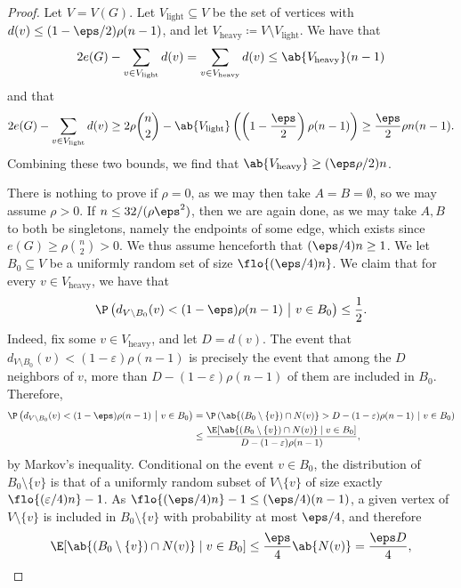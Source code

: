 \begin{proof}
    Let $V=V(G)$.
    Let $V_{\mathrm{light}}\subseteq V$ be the set of vertices with $d(v)\le (1-\eps/2)\rho (n-1)$, and let $V_{\mathrm{heavy}}\coloneqq V\setminus V_{\mathrm{light}}$. We have that 
    \[
    2e(G) - \sum_{v \in V_{\mathrm{light}}} d(v) = \sum_{v \in V_{\mathrm{heavy}}} d(v) \leq \ab{V_{\mathrm{heavy}}} (n-1)
    \]
    and that
    \[
     2e(G)-\sum_{v\in V_{\mathrm{light}}}d(v) \geq 2\rho \binom n2 - \ab{V_{\mathrm{light}}}\left(\left(1-\frac \eps 2\right) \rho (n-1)\right) \geq \frac \eps 2 \rho n(n-1).
    \]
    Combining these two bounds, we find that $\ab{V_{\mathrm{heavy}}}\geq (\eps \rho/2)n$.

    There is nothing to prove if $\rho=0$, as we may then take $A=B=\emptyset$, so we may assume $\rho>0$.
    If $n\leq 32/(\rho\eps^2)$, then we are again done, as we may take $A,B$ to both be singletons, namely the endpoints of some edge, which exists since $e(G) \geq \rho\binom n2>0$. We thus assume henceforth that $(\eps/4)n\geq 1$.
    We let $B_0\subseteq V$ be a uniformly random set of size $\flo{ (\eps/4)n} $. 
    We claim that for every $v \in V_{\mathrm{heavy}}$, we have that
    \begin{equation}\label{eq:heavy vtx}
        \P\left(d_{V\setminus B_0}(v)< (1-\eps)\rho (n-1) ~\middle|~ v\in B_0\right) \leq \frac 12.
    \end{equation}
    Indeed, fix some $v \in V_{\mathrm{heavy}}$, and let $D=d(v)$. The event that $d_{V \setminus B_0}(v) < (1-\varepsilon)\rho(n-1)$ is precisely the event that among the $D$ neighbors of $v$, more than $D-(1-\varepsilon)\rho(n-1)$ of them are included in $B_0$. Therefore,
    \begin{align*}
       \P\left(d_{V\setminus B_0}(v)< (1-\eps)\rho (n-1) ~\middle|~ v\in B_0\right) &= \P\left(\ab{(B_0 \setminus \{v\}) \cap N(v)}>D-(1-\varepsilon)\rho(n-1) ~\middle|~ v \in B_0\right)\\
        &\leq \frac{\E[\ab{(B_0 \setminus \{v\})\cap N(v)} \mid v \in B_0]}{D-(1-\varepsilon)\rho(n-1)},
    \end{align*}
    by Markov's inequality. 
    Conditional on the event $v \in B_0$, the distribution of $B_0 \setminus\{v\}$ is that of a uniformly random subset of $V \setminus \{v\}$ of size exactly $\flo{(\varepsilon/4)n}-1$.
    As $\flo{(\eps/4)n}-1 \leq (\eps/4)(n-1)$, a given vertex of $V \setminus \{v\}$ is included in $B_0 \setminus \{v\}$ with probability at most $\eps/4$, and therefore
    \[
    \E[\ab{(B_0 \setminus \{v\})\cap N(v)} \mid v \in B_0] \leq \frac \eps 4 \ab{N(v)} = \frac{\eps D}{4},
\]
\end{proof}
